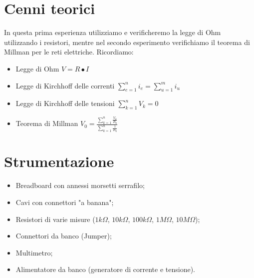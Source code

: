     \section{Cenni teorici}
    In questa prima esperienza utilizziamo e verificheremo la legge di Ohm utilizzando i resistori, mentre nel secondo esperimento
    verifichiamo il teorema di Millman per le reti elettriche.
    Ricordiamo:
    \begin{itemize}
        \item Legge di Ohm $V = R \bullet I$
        \item Legge di Kirchhoff delle correnti $\sum_{e = 1}^{n} i_e = \sum_{u = 1}^{m} i_u $
        \item Legge di Kirchhoff delle tensioni $\sum_{k = 1}^{n} V_k = 0 $
        \item Teorema di Millman $V_0 = \frac{\sum_{k = 1}^{n} \frac{V_k}{R_k} }{\sum_{k = 1}^{n} \frac{1}{R_k} }$
    \end{itemize}
    
    
    \section{Strumentazione}
    \begin{itemize}
        \item Breadboard con annessi morsetti serrafilo;
        \item Cavi con connettori "a banana";
        \item Resistori di varie misure ($1k\Omega$, $10k\Omega$, $100k\Omega$, $1M\Omega$, $10M\Omega$);
        \item Connettori da banco (Jumper);
        \item Multimetro;
        \item Alimentatore da banco (generatore di corrente e tensione).
    \end{itemize}

